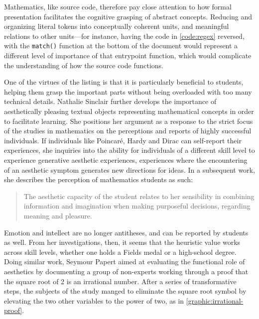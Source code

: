 Mathematics, like source code, therefore pay close attention to how formal presentation facilitates the cognitive grasping of abstract concepts. Reducing and organizing literal tokens into conceptually coherent units, and meaningful relations to other units—for instance, having the code in \ref{code:regex} reversed, with the \lstinline{match()} function at the bottom of the document would represent a different level of importance of that entrypoint function, which would complicate the understanding of how the source code functions.

One of the virtues of the listing is that it is particularly beneficial to students, helping them grasp the important parts without being overloaded with too many technical details. Nathalie Sinclair further develops the importance of aesthetically pleasing textual objects representing mathematical concepts in order to facilitate learning. She positions her argument as a response to the strict focus of the studies in mathematics on the perceptions and reports of highly successful individuals. If individuals like Poincaré, Hardy and Dirac can self-report their experiences, she inquiries into the ability for individuals of a different skill level to experience generative aesthetic experiences, experiences where the encountering of an aesthetic symptom generates new directions for ideas. In a subsequent work, she describes the perception of mathematics students as such:

\begin{quote}
    The aesthetic capacity of the student relates to her sensibility in combining information and imagination when making purposeful decisions, regarding meaning and pleasure. \citep{sinclair_aesthetic_2011}
\end{quote}

Emotion and intellect are no longer antitheses, and can be reported by students as well. From her investigations, then, it seems that the heuristic value works across skill levels, whether one holds a Fields medal or a high-school degree. Doing similar work, Seymour Papert aimed at evaluating the functional role of aesthetics by documenting a group of non-experts working through a proof that the square root of 2 is an irrational number. After a series of transformative steps, the subjects of the study manged to eliminate the square root symbol by elevating the two other variables to the power of two, as in \ref{graphic:irrational-proof}.


